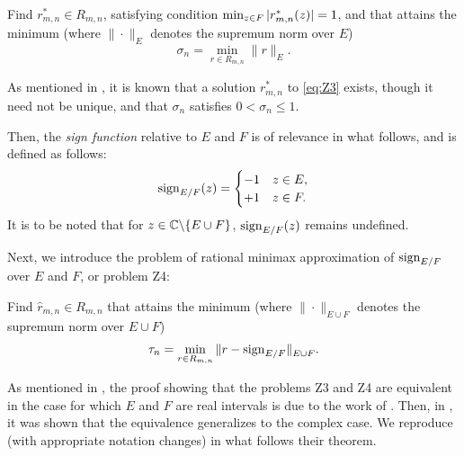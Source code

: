 \begin{problem}\label{pb:z3}
Find $r_{m,n}^*\in R_{m,n}$, satisfying condition $\min_{z\in F} |r_{m,n}^*(z)| = 1$, and that attains the minimum (where $\|\cdot\|_E^{}$ denotes the supremum norm over $E$)
\begin{equation}
\sigma_n = \min_{r \in R_{m,n}} \|r\|_E^{}.
\label{eq:Z3}
\end{equation}
\end{problem}

As mentioned in \cite{trefethen2024computation}, it is known that a solution $r_{m,n}^*$ to \cref{eq:Z3} exists, though it need not be unique, and that $\sigma_n$ satisfies $0 < \sigma_n \le 1$.

Then, the {\em sign function} relative to $E$ and $F$ is of relevance in what follows, and is defined as follows:
\begin{equation}
\mathrm{sign}_{E/F}(z) =
\begin{cases}
-1 & z\in E, \\ +1 & z\in F.
\end{cases}
\end{equation}
It is to be noted that for $z\in{\mathbb C}\backslash \{E\cup F\}$, $\mathrm{sign}_{E/F}(z)$ remains undefined.

Next, we introduce the problem of rational minimax approximation of $\mathrm{sign}_{E/F}$ over $E$ and $F$, or problem Z4: 

\begin{problem}\label{pb:z4}
Find $\hat r_{m,n}\in R_{m,n}$ that attains the minimum (where $\|\cdot\|_{E\cup F}$ denotes the supremum norm over $E\cup F$)
\begin{equation}
\tau_n = \min_{r\in R_{m,n}} \|r-\mathrm{sign}_{E/F}\|_{E\cup F}^{}.
\label{eq:Z4}
\end{equation}
\end{problem}

As mentioned in \cite{trefethen2024computation}, the proof showing that the problems Z3 and Z4 are equivalent in the case for which $E$ and $F$ are real intervals is due to the work of \cite{akhiezer1990elements}. Then, in \cite{istace1995third}, it was shown that the equivalence generalizes to the complex case.  We reproduce (with appropriate notation changes) in what follows their theorem.

